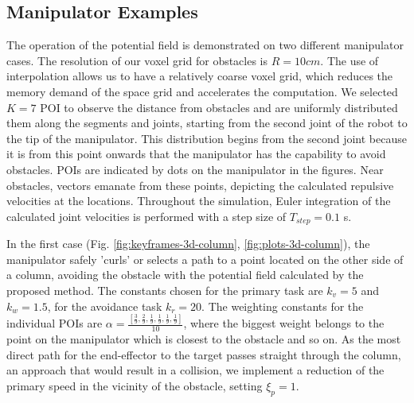 \documentclass[letterpaper, 10 pt, conference]{ieeeconf}  %
\begin{document}
\subsection{Manipulator Examples}

The operation of the potential field is demonstrated on two different manipulator cases. The resolution of our voxel grid for obstacles is \( R=10cm \). The use of interpolation allows us to have a relatively coarse voxel grid, which reduces the memory demand of the space grid and accelerates the computation. We selected \( K = 7 \) POI to observe the distance from obstacles and are uniformly distributed them along the segments and joints, starting from the second joint of the robot to the tip of the manipulator. This distribution begins from the second joint because it is from this point onwards that the manipulator has the capability to avoid obstacles. POIs are indicated by dots on the manipulator in the figures. Near obstacles, vectors emanate from these points, depicting the calculated repulsive velocities at the locations. Throughout the simulation, Euler integration of the calculated joint velocities is performed with a step size of \( T_{step} = 0.1 \) s.

In the first case (Fig. \ref{fig:keyframes-3d-column}, \ref{fig:plots-3d-column}), the manipulator safely 'curls' or selects a path to a point located on the other side of a column, avoiding the obstacle with the potential field calculated by the proposed method. The constants chosen for the primary task are \( k_v = 5 \) and \( k_w = 1.5 \), for the avoidance task \(k_r=20\). The weighting constants for the individual POIs are \( \alpha = \frac{[ \frac{3}{9}, \frac{2}{9}, \frac{1}{9}, \frac{1}{9}, \frac{1}{9}, \frac{1}{9} ]}{10} \), where the biggest weight belongs to the point on the manipulator which is closest to the obstacle and so on. As the most direct path for the end-effector to the target passes straight through the column, an approach that would result in a collision, we implement a reduction of the primary speed in the vicinity of the obstacle, setting \( \xi_{p} = 1 \).
\end{document}
